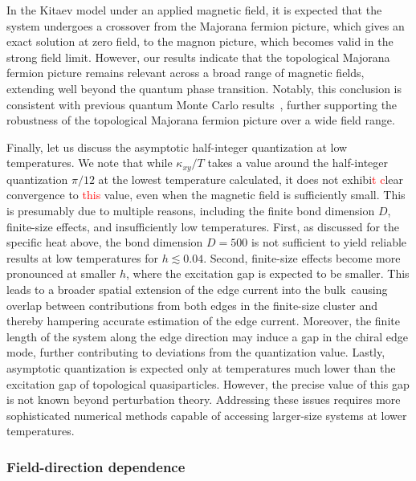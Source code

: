 \documentclass[twocolumn,superscriptaddress,showpacs, longbibliography, aps, prx]{revtex4-2}
\newcommand{\red}[1]{\textcolor{red}{#1}}
\begin{document}
In the Kitaev model under an applied magnetic field, it is expected that the system undergoes a crossover from the Majorana fermion picture, which gives an exact solution at zero field, to the magnon picture, which becomes valid in the strong field limit. 
However, our results indicate that the topological Majorana fermion picture remains relevant across a broad range of magnetic fields, extending well beyond the quantum phase transition. 
Notably, this conclusion is consistent with previous quantum Monte Carlo results~\cite{YoshitakeNKM2020}, further supporting the robustness of the topological Majorana fermion picture over a wide field range. 

Finally, let us discuss the asymptotic half-integer quantization at low temperatures. 
We note that while $\kappa_{xy}/T$ takes a value around the half-integer quantization $\pi/12$ at the lowest temperature calculated, it does not exhibi\red{t %
c}lear convergence to %
\red{this} value, even when the magnetic field is sufficiently small.
This is presumably due to multiple reasons, including the finite bond dimension $D$, finite-size effects, and insufficiently low temperatures.
First, as discussed for the specific heat above, the bond dimension $D=500$ is not sufficient to yield reliable results at low temperatures for $h\lesssim0.04$.
Second, finite-size effects become more pronounced at smaller $h$, where the excitation gap is expected to be smaller. 
This leads to a broader spatial extension of the edge current into the bulk\, causing overlap between contributions from both edges in the finite-size cluster and thereby hampering accurate estimation of the edge current. 
Moreover, the finite length of the system along the edge direction may induce a gap in the chiral edge mode, further contributing to deviations from the quantization value. 
Lastly, asymptotic quantization is expected only at temperatures much lower than the excitation gap of topological quasiparticles. 
However, the precise value of this gap is not known beyond perturbation theory. 
Addressing these issues requires more sophisticated numerical methods capable of accessing larger-size systems at lower temperatures. 

\subsubsection{Field-direction dependence}
\label{subsec:field_direction_dep}
\end{document}
